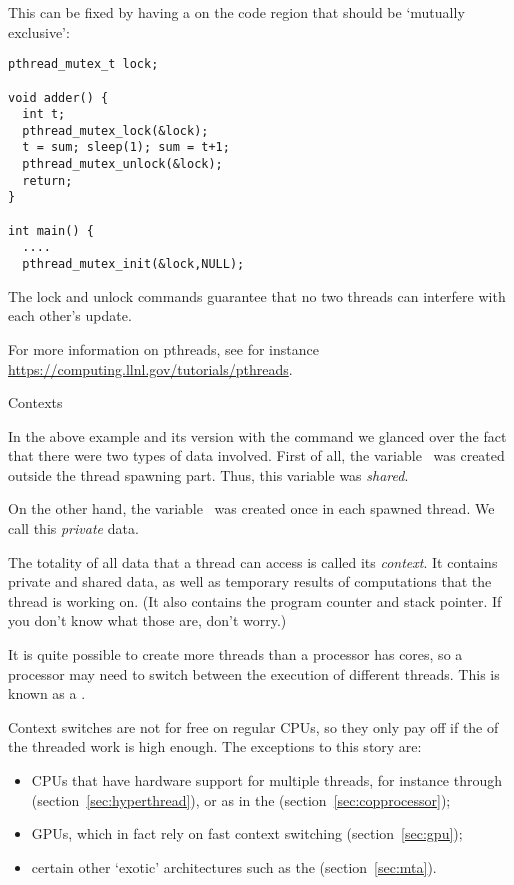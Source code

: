 This can be fixed by having a  on the code region that should be
`mutually exclusive':
\begin{verbatim}
pthread_mutex_t lock;

void adder() {
  int t;
  pthread_mutex_lock(&lock);
  t = sum; sleep(1); sum = t+1; 
  pthread_mutex_unlock(&lock);
  return;
}

int main() {
  ....
  pthread_mutex_init(&lock,NULL);

\end{verbatim}
The lock and unlock commands guarantee that no two threads can
interfere with each other's update.

For more information on pthreads, see for instance
\url{https://computing.llnl.gov/tutorials/pthreads}.


 {Contexts}
\label{sec:context}

In the above example and its version with the  command
we glanced over the fact that there were two types of data involved.
First of all, the variable~ was created outside the thread spawning
part. Thus, this variable was \emph{shared}.

On the other hand, the variable~ was created once in each spawned thread.
We call this \emph{private} data.

The totality of all data that a thread can access is called
its \emph{context}.  It contains private and shared data, as well as
temporary results of computations that the thread is working
on.
(It also contains the program counter and stack pointer. If
    you don't know what those are, don't worry.)

It is quite possible to create more threads than a processor has cores,
so a processor may need to switch between the execution of different threads.
This is known as a .

Context switches are not for free on regular CPUs, so they only pay off
if the  of the threaded work is high enough.
The exceptions to this story are:
\begin{itemize}
\item CPUs that have hardware support for multiple threads, for
  instance through 
  (section~\ref{sec:hyperthread}), or as in the
   (section~\ref{sec:copprocessor});
\item \acp{GPU}, which in fact rely on fast context switching (section~\ref{sec:gpu});
\item certain other `exotic' architectures such as the 
  (section~\ref{sec:mta}).
\end{itemize}

